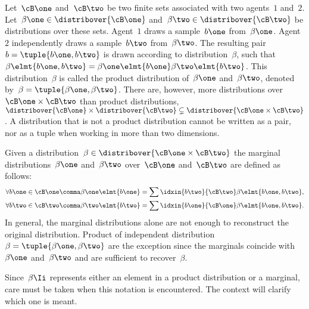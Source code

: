 \begin{note}
\label{sec:distribution_over_product_spaces}
Let~\(\cB\one\) and~\(\cB\two\) be two finite sets associated with two agents~\(1\) and~\(2\).
Let~\(\beta\one \in \distribover{\cB\one}\) and~\(\beta\two \in \distribover{\cB\two}\) be distributions over these sets.
Agent~\(1\) draws a sample~\(b\one\) from~\(\beta\one\).
Agent~\(2\) independently draws a sample~\(b\two\) from~\(\beta\two\).
The resulting pair~\(b = \tuple{b\one, b\two}\) is drawn according to distribution~\(\beta\), such that~\(\beta \elmt {b\one, b\two} = \beta\one \elmt {b\one} \beta\two \elmt {b\two}\).
This distribution~\(\beta\) is called the product distribution of~\(\beta\one\) and~\(\beta\two\), denoted by~\(\beta = \tuple{\beta\one, \beta\two}\).
There are, however, more distributions over~\(\cB\one \times \cB\two\) than product distributions, \ie~\(\distribover{\cB\one} \times \distribover{\cB\two} \subsetneq \distribover{\cB\one \times \cB\two}\).
A distribution that is not a product distribution cannot be written as a pair, nor as a tuple when working in more than two dimensions.

Given a distribution~\(\beta \in \distribover{\cB\one \times \cB\two}\) the marginal distributions~\(\beta\one\) and~\(\beta\two\) over~\(\cB\one\) and~\(\cB\two\) are defined as follows:
\[
\begin{aligned}
\forall b\one \in \cB\one\comma \beta\one \elmt{b\one} &= \sum\idxin{b\two}{\cB\two} \beta \elmt{b\one, b\two}, \\
\forall b\two \in \cB\two\comma \beta\two \elmt{b\two} &= \sum\idxin{b\one}{\cB\one} \beta \elmt{b\one, b\two}.
\end{aligned}
\]
In general, the marginal distributions alone are not enough to reconstruct the original distribution.
Product of independent distribution~\(\beta = \tuple{\beta\one, \beta\two}\) are the exception since the marginals coincide with~\(\beta\one\) and~\(\beta\two\) and are sufficient to recover~\(\beta\).

Since~\(\beta\Ii\) represents either an element in a product distribution or a marginal, care must be taken when this notation is encountered.
The context will clarify which one is meant.


\end{note}
